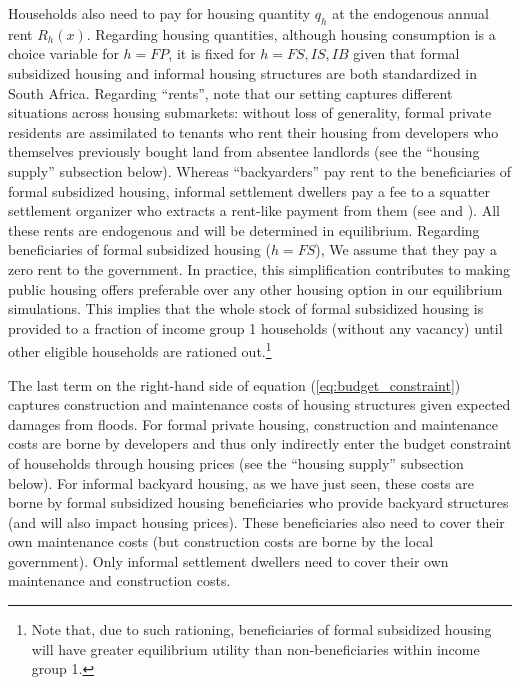 \documentclass[12pt]{article}
\begin{document}
Households also need to pay for housing quantity $q_{h}$ at the endogenous annual rent $R_{h}(x)$. Regarding housing quantities, although housing consumption is a choice variable for $h=FP$, it is fixed for $h=FS,IS,IB$ given that formal subsidized housing and informal housing structures are both standardized in South Africa. Regarding ``rents'', note that our setting captures different situations across housing submarkets: without loss of generality, formal private residents are assimilated to tenants who rent their housing from developers who themselves previously bought land from absentee landlords (see the ``housing supply'' subsection below). Whereas ``backyarders'' pay rent to the beneficiaries of formal subsidized housing, informal settlement dwellers pay a fee to a squatter settlement organizer who extracts a rent-like payment from them (see \citet{Brueckner2009ACountries} and \citet{Marx2019ThereSlum}). All these rents are endogenous and will be determined in equilibrium. Regarding beneficiaries of formal subsidized housing ($h=FS$), We assume that they pay a zero rent to the government. In practice, this simplification contributes to making public housing offers preferable over any other housing option in our equilibrium simulations. This implies that the whole stock of formal subsidized housing is provided to a fraction of income group 1 households (without any vacancy) until other eligible households are rationed out.\footnote{Note that, due to such rationing, beneficiaries of formal subsidized housing will have greater equilibrium utility than non-beneficiaries within income group 1.} 

The last term on the right-hand side of equation (\ref{eq:budget_constraint}) captures construction and maintenance costs of housing structures given expected damages from floods. For formal private housing, construction and maintenance costs are borne by  developers and thus only indirectly enter the budget constraint of households through housing prices (see the ``housing supply'' subsection below). For informal backyard housing, as we have just seen, these costs are borne by formal subsidized housing beneficiaries who provide backyard structures (and will also impact housing prices). These beneficiaries also need to cover their own maintenance costs (but construction costs are borne by the local government). Only informal settlement dwellers need to cover their own maintenance and construction costs.

\end{document}
